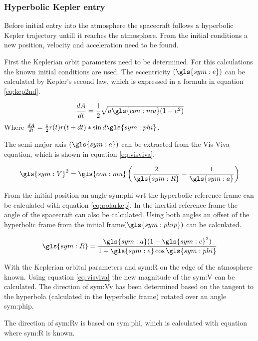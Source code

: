 \subsubsection{Hyperbolic Kepler entry}
 \label{sec:hypkep}
Before initial entry into the atmosphere the spacecraft follows a hyperbolic Kepler trajectory untill it reaches the atmosphere. From the initial conditions a new position, velocity and acceleration need to be found. 

First the Keplerian orbit parameters need to be determined. For this calculations the known initial conditions are used. The eccentricity $\left(\gls{sym:e}\right)$ can be calculated by Kepler's second law, which is expressed in a formula in equation \ref{eq:kep2nd}.

\begin{equation}
\frac{dA}{dt} = \frac{1}{2}\sqrt{a\gls{con:mu}(1-e^2)}
\label{eq:kep2nd}
\end{equation}
Where $\frac{dA}{dt} = \frac{1}{2}r(t)r(t+dt)*\sin{d\gls{sym:phi}}$.

The semi-major axis $\left(\gls{sym:a}\right)$ can be extracted from the Vis-Viva equation, which is shown in equation \ref{eq:visviva}.

\begin{equation}
\gls{sym:V}^2 = \gls{con:mu}\left(\frac{2}{\gls{sym:R}}-\frac{1}{\gls{sym:a}}\right)
\label{eq:visviva}
\end{equation}

From the initial position an angle \gls{sym:phi} wrt the hyperbolic reference frame can be calculated with equation \ref{eq:polarkep}. In the inertial reference frame the angle of the spacecraft can also be calculated. Using both angles an offset of the hyperbolic frame from the initial frame$\left (\gls{sym:phip}\right)$ can be calculated.

\begin{equation}
\gls{sym:R} = \frac{\gls{sym:a}(1-\gls{sym:e}^2)}{1+\gls{sym:e}\cos{\gls{sym:phi}}}
\label{eq:polarkep}
\end{equation}

With the Keplerian orbital parameters and \gls{sym:R} on the edge of the atmosphere known. Using equation \ref{eq:visviva} the new magnitude of the \gls{sym:V} can be calculated. The direction of \gls{sym:Vv} has been determined based on the tangent to the hyperbola (calculated in the hyperbolic frame) rotated over an angle \gls{sym:phip}.

The direction of \gls{sym:Rv} is based on \gls{sym:phi}, which is calculated with equation \label{eq:polarkep} where \gls{sym:R} is known.

